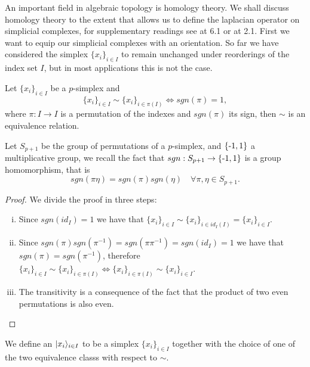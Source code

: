 \documentclass[../1.tex]{subfiles}
\begin{document}
    An important field in algebraic topology is homology theory. We shall discuss homology theory to the extent
    that allows us to define the laplacian operator on simplicial complexes, for supplementary readings see \cite{singerthorpe} at 6.1 or \cite{hatcher} at 2.1.
    First we want to equip our simplicial complexes with an orientation. So far we have considered the simplex $\{x_i\}_{i \in I}$ to remain
    unchanged under reorderings of the index set $I$, but in most applications this is not the case.

    \begin{prop}
        Let $\{x_i\}_{i \in I}$ be a $p$-simplex and
        \[ \{x_i\}_{i \in I} \sim \{x_i\}_{i \in \pi(I)} \iff sgn(\pi) = 1,\]
        where $\pi : I \to I$ is a permutation of the indexes and $sgn(\pi)$ its sign, then $\sim$
        is an equivalence relation.
    \end{prop}
    \begin{rem}
        Let $S_{p+1}$ be the group of permutations of a $p$-simplex, and $\{\text{-}1,1\}$ a multiplicative group,
        we recall the fact that $sgn: S_{p+1} \to \{\text{-}1,1\}$ is a group homomorphism, that is \[sgn(\pi\eta) = sgn(\pi)sgn(\eta) \quad \forall \pi,\eta \in S_{p+1}.\]
    \end{rem}
    \begin{proof}
        We divide the proof in three steps:
        \begin{enumerate}[(i)]
            \item Since $sgn(id_I) = 1$ we have that $\{x_i\}_{i \in I} \sim \{x_i\}_{i \in id_I(I)} = \{x_i\}_{i \in I} $.
            \item Since $sgn(\pi)sgn(\pi^{-1}) = sgn(\pi\pi^{-1})=sgn(id_I)=1$ we have that $sgn(\pi) = sgn(\pi^{-1})$, therefore
                  $ \{x_i\}_{i \in I} \sim \{x_i\}_{i \in \pi(I)} \iff \{x_i\}_{i \in \pi(I)} \sim \{x_i\}_{i \in I}$.
            \item The transitivity is a consequence of the fact that the product of two even permutations is also even.\qedhere
        \end{enumerate}
    \end{proof}
  
    \begin{defn}
        We define an  $| x_i \rangle_{i \in I}$ to be a simplex $\{x_i\}_{i \in I}$ together with the choice of
        one of the two equivalence classs with respect to $\sim$.
    \end{defn}
\end{document}
